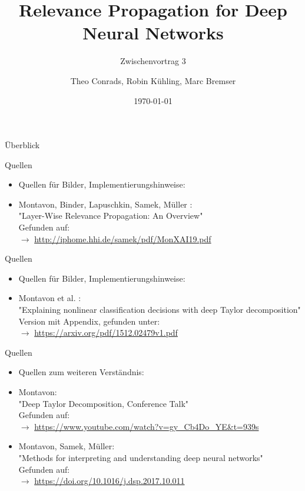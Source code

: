 \documentclass[t, compress]{beamer}
\title{Relevance Propagation for Deep Neural Networks}
\subtitle{Zwischenvortrag 3}
\author{Theo Conrads, Robin K\"uhling, Marc Bremser}
\date{\today}
\begin{document}
\begin{frame}
	\titlepage
\end{frame}

\begin{frame}{Überblick}
  \tableofcontents[hideallsubsections]
\end{frame}









\begin{frame}{Quellen}
\begin{itemize}
\item Quellen für Bilder, Implementierungshinweise:
\item Montavon, Binder, Lapuschkin, Samek, Müller :  \\
"{}Layer-Wise Relevance Propagation: An Overview"{}\\
Gefunden auf: \\
$\rightarrow$ \url{http://iphome.hhi.de/samek/pdf/MonXAI19.pdf}
\label{itm:LRPOv}
\end{itemize}
\end{frame}

\begin{frame}{Quellen}
\begin{itemize}
\item Quellen für Bilder, Implementierungshinweise:
\item Montavon et al. : \\
"{}Explaining nonlinear classification decisions with deep Taylor decomposition"{}\\
Version mit Appendix, gefunden unter:\\
$\rightarrow$ \url{https://arxiv.org/pdf/1512.02479v1.pdf}
\label{itm:Mont17}
\end{itemize}
\end{frame}

\begin{frame}{Quellen}
\begin{itemize}
\item Quellen zum weiteren Verständnis:
\item Montavon: \\
"{}Deep Taylor Decomposition, Conference Talk"{}\\
Gefunden auf: \\
$\rightarrow$ \url{https://www.youtube.com/watch?v=gy_Cb4Do_YE&t=939s}
\label{itm:MontTalk}
\item Montavon, Samek, Müller:  \\
"{}Methods for interpreting and understanding deep neural networks"{}\\
Gefunden auf: \\
$\rightarrow$ \url{https://doi.org/10.1016/j.dsp.2017.10.011}
\label{itm:MethodsPaper}
\end{itemize}

\end{frame}


%
\end{document}

